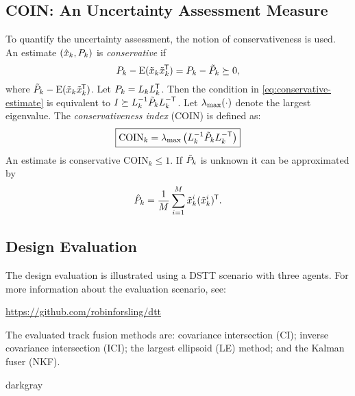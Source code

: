 \documentclass[a0paper,portrait,twocols]{def/LiUposter} %
\begin{document}
{\begin{minipage}{\columnwidth}
\subsection{COIN: An Uncertainty Assessment Measure}

To quantify the uncertainty assessment, the notion of conservativeness is used. An estimate $(\xhat_k,P_k)$ is \emph{conservative} if
\begin{equation}
	P_k - \EV(\xtilde_k\xtilde_k\trnsp) = P_k - \Ptilde_k \succeq 0,
	\label{eq:conservative-estimate}
\end{equation}
where $\Ptilde_k-\EV(\xtilde_k\xtilde_k\trnsp)$. Let $P_k=L_kL_k\trnsp$. Then the condition in \eqref{eq:conservative-estimate} is equivalent to $I\succeq L_k\inv\Ptilde_k L_k\invtrnsp$. Let $\lambdamax(\cdot)$ denote the largest eigenvalue. The \emph{conservativeness index} (COIN) is defined as:
\begin{equation*}
	\boxed{\text{COIN}_k = \lambdamax\left(L_k\inv\Ptilde_k L_k\invtrnsp\right)}
\end{equation*} 
An estimate is conservative \textiff COIN$_k\leq 1$. If $\Ptilde_k$ is unknown it can be approximated by
\begin{equation*}
	\Phat_k = \frac{1}{M} \sum_{i=1}^M \xtilde_k^i(\xtilde_k^i)\trnsp.
\end{equation*} 




\subsection{Design Evaluation}

The design evaluation is illustrated using a DSTT scenario with three agents. For more information about the evaluation scenario, see:
 
\begin{center}
	\url{https://github.com/robinforsling/dtt}
\end{center}

The evaluated track fusion methods are: covariance intersection (CI); inverse covariance intersection (ICI); the largest ellipsoid (LE) method; and the \naive Kalman fuser (NKF).



\begin{mybox}[title={Design Evaluation Results}]{darkgray}
\begin{center}
	\begin{tikzpicture}[xscale=1.15]
		
	\end{tikzpicture}
\end{center}


\end{mybox}
\end{minipage}}
\end{document}
